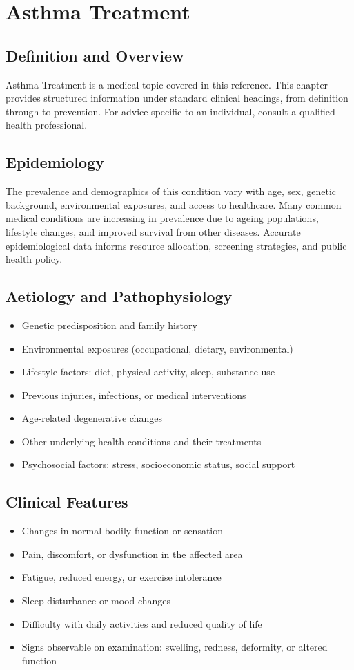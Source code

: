 \chapter{Asthma Treatment}

\section*{Definition and Overview}
Asthma Treatment is a medical topic covered in this reference. This chapter provides structured information under standard clinical headings, from definition through to prevention. For advice specific to an individual, consult a qualified health professional.

\section*{Epidemiology}
The prevalence and demographics of this condition vary with age, sex, genetic background, environmental exposures, and access to healthcare. Many common medical conditions are increasing in prevalence due to ageing populations, lifestyle changes, and improved survival from other diseases. Accurate epidemiological data informs resource allocation, screening strategies, and public health policy.

\section*{Aetiology and Pathophysiology}
\begin{itemize}
    \item Genetic predisposition and family history
    \item Environmental exposures (occupational, dietary, environmental)
    \item Lifestyle factors: diet, physical activity, sleep, substance use
    \item Previous injuries, infections, or medical interventions
    \item Age-related degenerative changes
    \item Other underlying health conditions and their treatments
    \item Psychosocial factors: stress, socioeconomic status, social support
\end{itemize}

\section*{Clinical Features}
\begin{itemize}
    \item Changes in normal bodily function or sensation
    \item Pain, discomfort, or dysfunction in the affected area
    \item Fatigue, reduced energy, or exercise intolerance
    \item Sleep disturbance or mood changes
    \item Difficulty with daily activities and reduced quality of life
    \item Signs observable on examination: swelling, redness, deformity, or altered function
\end{itemize}

